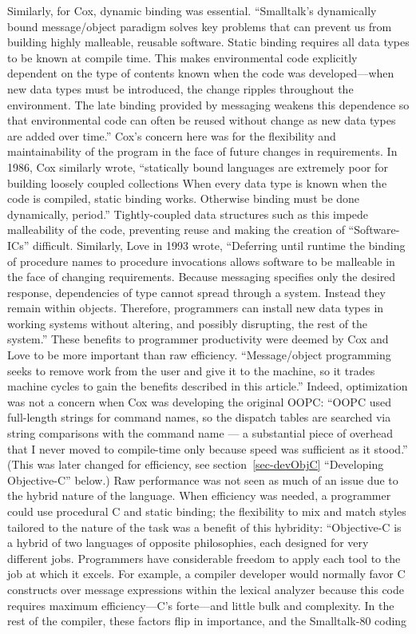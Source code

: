 \documentclass[acmsmall]{acmart}\settopmatter{}
\begin{document}
Similarly, for Cox, dynamic binding was essential. ``Smalltalk's dynamically bound message/object paradigm solves key problems that can prevent us from building highly malleable, reusable software. Static binding requires all data types to be known at compile time. This makes environmental code explicitly dependent on the type of contents known when the code was developed---when new data types must be introduced, the change ripples throughout the environment. The late binding provided by messaging weakens this dependence so that environmental code can often be reused without change as new data types are added over time.'' \citep[61]{cox_message/object_1984} Cox's concern here was for the flexibility and maintainability of the program in the face of future changes in requirements. In 1986, Cox similarly wrote, ``statically bound languages are extremely poor for building loosely coupled collections\textellipsis{} When every data type is known when the code is compiled, static binding works. Otherwise binding must be done dynamically, period.'' \citep[24]{cox_object-oriented_1986} Tightly-coupled data structures such as this impede malleability of the code, preventing reuse and making the creation of ``Software-ICs'' difficult. Similarly, Love in 1993 wrote, ``Deferring until runtime the binding of procedure names to procedure invocations allows software to be malleable in the face of changing requirements.\textellipsis{} Because messaging specifies only the desired response, dependencies of type cannot spread through a system. Instead they remain within objects. Therefore, programmers can install new data types in working systems without altering, and possibly disrupting, the rest of the system.'' \citep[30]{love_object_1995} These benefits to programmer productivity were deemed by Cox and Love to be more important than raw efficiency. ``Message/object programming seeks to remove work from the user and give it to the machine, so it trades machine cycles to gain the benefits described in this article.'' \citep[60]{cox_message/object_1984} Indeed, optimization was not a concern when Cox was developing the original OOPC: ``OOPC used full-length strings for command names, so the dispatch tables are searched via string comparisons with the command name --- a substantial piece of overhead that I never moved to compile-time only because speed was sufficient as it stood.'' \citep[60]{cox_message/object_1983} (This was later changed for efficiency, see section~\ref{sec-devObjC} ``Developing Objective-C'' below.) Raw performance was not seen as much of an issue due to the hybrid nature of the language. When efficiency was needed, a programmer could use procedural C and static binding; the flexibility to mix and match styles tailored to the nature of the task was a benefit of this hybridity: ``Objective-C is a hybrid of two languages of opposite philosophies, each designed for very different jobs. Programmers have considerable freedom to apply each tool to the job at which it excels. For example, a compiler developer would normally favor C constructs over message expressions within the lexical analyzer because this code requires maximum efficiency---C's forte---and little bulk and complexity. In the rest of the compiler, these factors flip in importance, and the Smalltalk-80 coding 
\end{document}
